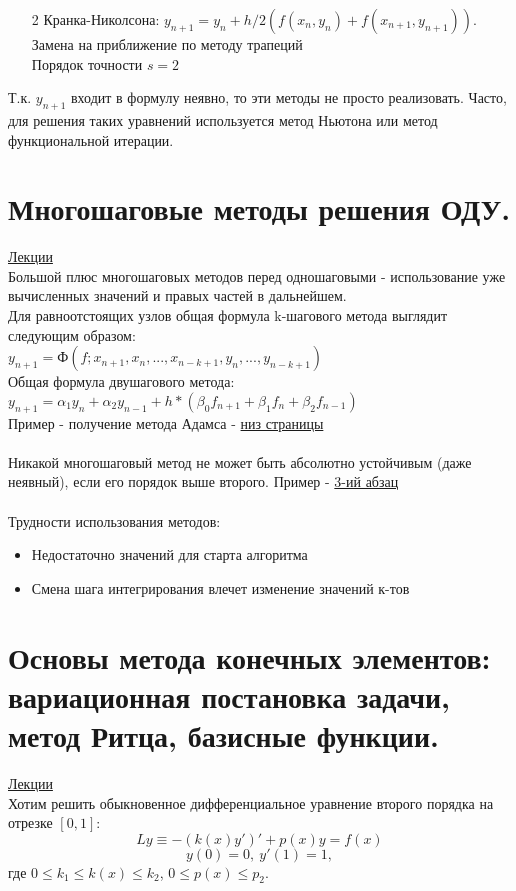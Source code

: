 \documentclass[specialist, subf, href, colorlinks=true, 12pt, times, mtpro, final]{disser}
\theoremstyle{definition}
\begin{document}
{\begin{itemize}
    
    \item[2] Кранка-Николсона: $y_{n+1} = y_n + h/2(f(x_n,y_n) + f(x_{n+1}, y_{n+1}))$. \\
    Замена на приближение по методу трапеций\\
    Порядок точности $s=2$\\
    
    \end{itemize}
    
    Т.к. $y_{n+1}$ входит в формулу неявно, то эти методы не просто реализовать.  Часто, для решения таких уравнений используется метод Ньютона или метод функциональной итерации.
    

\section {Многошаговые методы решения ОДУ.}
    \hyperlink {lects.92}{Лекции}\\
    Большой плюс многошаговых методов перед одношаговыми - использование уже вычисленных значений и правых частей в дальнейшем.\\
    Для равноотстоящих узлов общая формула k-шагового метода выглядит следующим образом:\\
    $y_{n+1} = Ф(f;x_{n+1},x_n,...,x_{n-k+1},y_n,...,y_{n-k+1})$\\
    Общая формула двушагового метода:\\
    $y_{n+1} = \alpha_1y_n +\alpha_2y_{n-1} + h*(\beta_0f_{n+1} + \beta_1f_n + \beta_2f_{n-1})$\\ 
    
    Пример - получение метода Адамса - \hyperlink {lects.92}{низ страницы}\\\\

    
    Никакой многошаговый метод не может быть абсолютно устойчивым (даже неявный), если его порядок выше второго. Пример - \hyperlink {lects.93}{3-ий абзац}\\
    \\
    Трудности использования методов: 
    \begin{itemize}
    \item Недостаточно значений для старта алгоритма
    \item Смена шага интегрирования влечет изменение значений к-тов
    \end{itemize}

\section {Основы метода конечных элементов: вариационная постановка задачи, метод Ритца, базисные функции.}
    \hyperlink {lects.97}{Лекции}\\
    Хотим решить обыкновенное дифференциальное уравнение второго порядка на отрезке $[0,1]$:
    $$
        Ly \equiv -(k(x)y')' + p(x) y =f(x)
    $$
    $$
        y(0) = 0, \ y'(1) = 1,
    $$
    где $0 \le k_1 \le k(x) \le k_2$, $0 \le p(x) \le p_2$.
    
}
\end{document}
